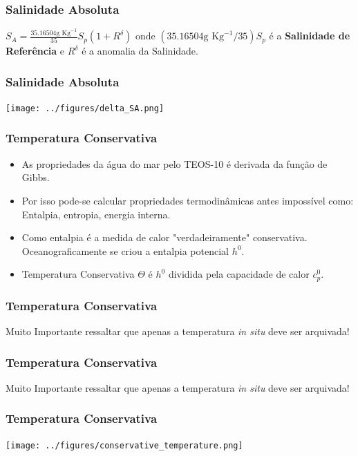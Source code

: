\begin{frame}
\frametitle{Salinidade Absoluta}
    \begin{block}{}
        $S_A = \frac{35.16504 \text{g Kg}^{-1}}{35} S_p(1 + R^{\delta})$ onde
        $(35.16504 \text{g Kg}^{-1}/35) S_p$ é a {\bf Salinidade de Referência}
        e $R^{\delta}$ é a anomalia da Salinidade.
    \end{block}
\end{frame}

\begin{frame}
\frametitle{Salinidade Absoluta}
    \begin{center}
        \texttt{[image: ../figures/delta\_SA.png]}
    \end{center}
\end{frame}

\begin{frame}
\frametitle{Temperatura Conservativa}
    \begin{itemize}[<+-| alert@+>]
        \item As propriedades da água do mar pelo TEOS-10 é derivada da função de
              Gibbs.
        \item Por isso pode-se calcular  propriedades termodinâmicas antes
              impossível como: Entalpia, entropia, energia interna.
        \item Como entalpia é a medida de calor "verdadeiramente" conservativa.
              Oceanograficamente se criou a entalpia potencial $h^0$.
        \item Temperatura Conservativa $\Theta$ é $h^0$ dividida pela
              capacidade de calor $c_p^0$.
    \end{itemize}
\end{frame}

\begin{frame}
\frametitle{Temperatura Conservativa}
    \begin{block}{}
        Muito Importante ressaltar que apenas a temperatura {\it in situ} deve
        ser arquivada!
    \end{block}
\end{frame}

\begin{frame}
\frametitle{Temperatura Conservativa}
    \begin{block}{}
        Muito Importante ressaltar que apenas a temperatura {\it in situ} deve
        ser arquivada!
    \end{block}
\end{frame}

\begin{frame}
\frametitle{Temperatura Conservativa}
    \begin{center}
        \texttt{[image: ../figures/conservative\_temperature.png]}
    \end{center}
\end{frame}


